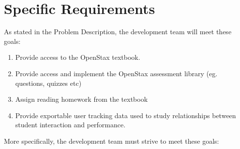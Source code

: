 \documentclass[onecolumn, draftclsnofoot,10pt, compsoc]{IEEEtran}
\begin{document}
\section{Specific Requirements}
As stated in the Problem Description, the development team will meet these goals:
\begin{enumerate}
\item Provide access to the OpenStax textbook.
\item Provide access and implement the OpenStax assessment library (eg. questions, quizzes etc)
\item Assign reading homework from the textbook
\item Provide exportable user tracking data used to study relationships between student interaction and performance. 
\end{enumerate}
More specifically, the development team must strive to meet these goals:
\end{document}
